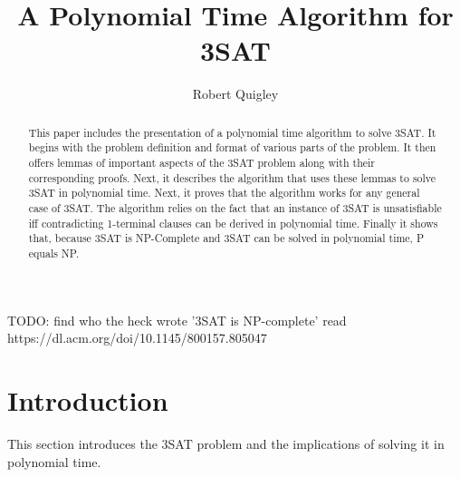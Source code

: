 \documentclass[manuscript]{acmart}
\begin{document}
    \title{A Polynomial Time Algorithm for 3SAT} 
    \author{Robert Quigley}
    
    \begin{abstract}
        This paper includes the presentation of a polynomial time algorithm to
        solve 3SAT. It begins with the problem definition and format of various
        parts of the problem. It then offers lemmas of important aspects of 
        the 3SAT problem along with their corresponding proofs. Next, it describes
        the algorithm that uses these lemmas to solve 3SAT in polynomial time. Next, it proves
        that the algorithm works for any general case of 3SAT. The algorithm relies
        on the fact that an instance of 3SAT is unsatisfiable iff contradicting
        1-terminal clauses can be derived in polynomial time. Finally it shows that, 
        because 3SAT is NP-Complete and 3SAT can be solved in polynomial time, 
        P equals NP.
    \end{abstract}
    
    
    \maketitle 

    
    TODO: find who the heck wrote '3SAT is NP-complete'
    read https://dl.acm.org/doi/10.1145/800157.805047

    \section{Introduction}

        This section introduces the 3SAT problem and the implications of
        solving it in polynomial time.
\end{document}
